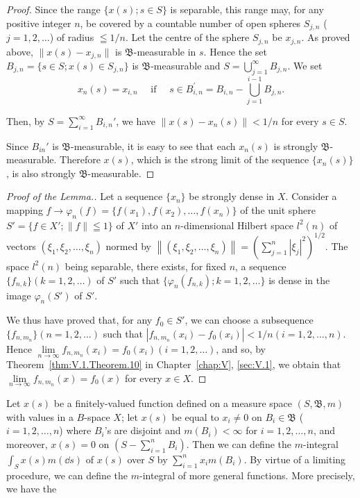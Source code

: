 \begin{proof}
Since the range $\{x(s); s \in S\}$ is separable, this range may, for any positive integer $n$, be covered by a countable number of open spheres $S_{j,n}$ ( $j = 1, 2, \ldots$) of radius $\leqq 1/n$. Let the centre of the sphere $S_{j,n}$ be $x_{j,n}$. As proved above, $\|x(s) - x_{j,n}\|$ is $\mathfrak{B}$-measurable in $s$. Hence the set $B_{j,n} = \{s \in S; x(s) \in S_{j,n}\}$ is $\mathfrak{B}$-measurable and $S = \bigcup\limits_{j=1}^{\infty} B_{j,n}$. We set 
\[
x _{n} (s) = x _{i,n} \quad \text{ if } \quad s \in B _{i,n} ^{\prime} = B _{i,n} - \bigcup\limits_{j=1} ^{i-1} B _{j,n}.
\]

Then, by $S = \sum\limits_{i=1}^{\infty} B_{i,n}'$, we have $\|x(s) - x_n(s)\| < 1/n$ for every $s \in S$.  

Since $B_{in}'$ is $\mathfrak{B}$-measurable, it is easy to see that each $x_{n}(s)$ is strongly $\mathfrak{B}$-measurable. Therefore $x(s)$, which is the strong limit of the sequence $\{x_{n}(s)\}$, is also strongly $\mathfrak{B}$-measurable. 
\end{proof}

\begin{proof}[Proof of the Lemma.]
Let a sequence $\{x_{n}\}$ be strongly dense in $X$. Consider a mapping $f \to \varphi_{n}(f) = \{f(x_{1}), f(x_{2}), \ldots, f(x_{n})\}$ of the unit sphere $S' = \{f \in X'; \|f\| \leqq 1\}$ of $X'$ into an $n$-dimensional Hilbert space $l^{2}(n)$ of vectors $(\xi_{1}, \xi_{2}, \ldots, \xi_{n})$ normed by $\left\|\left(\xi_{1}, \xi_{2}, \ldots, \xi_{n}\right)\right\| = \left(\sum\limits_{j=1}^{n} |\xi_{j}|^{2}\right)^{1/2}$. The space $l^{2}(n)$ being separable, there exists, for fixed $n$, a sequence $\{f_{n,k}\} (k = 1, 2, \ldots)$ of $S'$ such that $\{\varphi_{n}(f_{n,k}); k = 1, 2, \ldots\}$ is dense in the image $\varphi_{n}(S')$ of $S'$. 

We thus have proved that, for any $f_0 \in S'$, we can choose a subsequence $\{f_{n,m_n}\} (n = 1, 2, \ldots)$ such that $|f_{n,m_n}(x_i) - f_0(x_i)| < 1/n (i = 1, 2, \ldots, n)$. Hence $\lim\limits_{n \to \infty} f_{n,m_n}(x_i) = f_0(x_i) (i = 1, 2, \ldots)$, and so, by Theorem~\ref{thm:V.1.Theorem.10} in Chapter~\ref{chap:V}, \ref{sec:V.1}, we obtain that $\lim\limits_{n \to \infty} f_{n,m_n}(x) = f_0(x)$ for every $x \in X$. 
\end{proof}

\label{sec:V.5}

Let $x(s)$ be a finitely-valued function defined on a measure space $(S, \mathfrak{B}, m)$ with values in a $B$-space $X$; let $x(s)$ be equal to $x_i \neq 0$ on $B_i \in \mathfrak{B}$ ( $i = 1, 2, \ldots, n$) where $B_i$'s are disjoint and $m(B_i) < \infty$ for $i = 1, 2, \ldots, n$, and moreover, $x(s) = 0$ on $\left(S - \sum\limits_{i=1}^{n} B_i\right)$. Then we can define the $m$-integral $\int_S x(s) m(\dd s)$ of $x(s)$ over $S$ by $\sum\limits_{i=1}^{n} x_i m(B_i)$. By virtue of a limiting procedure, we can define the $m$-integral of more general functions. More precisely, we have the 

